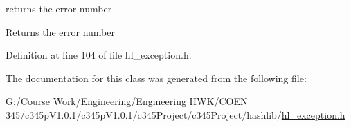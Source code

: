 returns the error number \begin{DoxyReturn}{Returns}
the error number 
\end{DoxyReturn}


Definition at line 104 of file hl\_\-exception.h.

The documentation for this class was generated from the following file:\begin{DoxyCompactItemize}
\item 
G:/Course Work/Engineering/Engineering HWK/COEN 345/c345pV1.0.1/c345pV1.0.1/c345Project/c345Project/hashlib/\hyperlink{hl__exception_8h}{hl\_\-exception.h}\end{DoxyCompactItemize}
